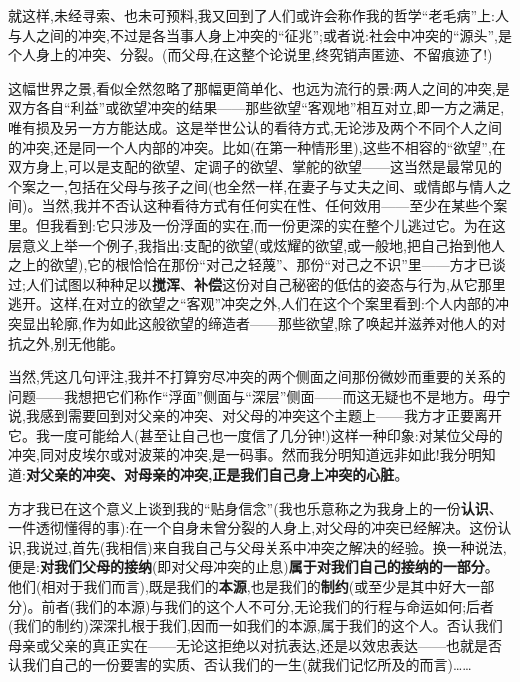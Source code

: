 就这样,未经寻索、也未可预料,我又回到了人们或许会称作我的哲学“老毛病”上:人与人之间的冲突,不过是各当事人身上冲突的“征兆”;或者说:社会中冲突的“源头”,是个人身上的冲突、分裂。(而父母,在这整个论说里,终究销声匿迹、不留痕迹了!)

这幅世界之景,看似全然忽略了那幅更简单化、也远为流行的景:两人之间的冲突,是双方各自“利益”或欲望冲突的结果——那些欲望“客观地”相互对立,即一方之满足,唯有损及另一方方能达成。这是举世公认的看待方式,无论涉及两个不同个人之间的冲突,还是同一个人内部的冲突。比如(在第一种情形里),这些不相容的“欲望”,在双方身上,可以是支配的欲望、定调子的欲望、掌舵的欲望——这当然是最常见的个案之一,包括在父母与孩子之间(也全然一样,在妻子与丈夫之间、或情郎与情人之间\dmark{})。当然,我并不否认这种看待方式有任何实在性、任何效用——至少在某些个案里。但我看到:它只涉及一份浮面的实在,而一份更深的实在整个儿逃过它。为在这层意义上举一个例子,我指出:支配的欲望(或炫耀的欲望,或一般地,把自己抬到他人之上的欲望),它的根恰恰在那份“对己之轻蔑”、那份“对己之不识”里——方才已谈过;人们试图以种种足以\textbf{搅浑}、\textbf{补偿}这份对自己秘密的低估的姿态与行为,从它那里逃开。这样,在对立的欲望之“客观”冲突之外,人们在这个个案里看到:个人内部的冲突显出轮廓,作为如此这般欲望的缔造者——那些欲望,除了唤起并滋养对他人的对抗之外,别无他能。

当然,凭这几句评注,我并不打算穷尽冲突的两个侧面之间那份微妙而重要的关系的问题——我想把它们称作“浮面”侧面与“深层”侧面——而这无疑也不是地方。毋宁说,我感到需要回到对父亲的冲突、对父母的冲突这个主题上——我方才正要离开它。我一度可能给人(甚至让自己也一度信了几分钟!)这样一种印象:对某位父母的冲突,同对皮埃尔或对波莱的冲突,是一码事。然而我分明知道远非如此!我分明知道:\textbf{对父亲的冲突、对母亲的冲突,正是我们自己身上冲突的心脏}。

方才我已在这个意义上谈到我的“贴身信念”(我也乐意称之为我身上的一份\textbf{认识}、一件透彻懂得的事):在一个自身未曾分裂的人身上,对父母的冲突已经解决。这份认识,我说过,首先(我相信)来自我自己与父母关系中冲突之解决的经验。换一种说法,便是:\textbf{对我们父母的接纳}(即对父母冲突的止息)\textbf{属于对我们自己的接纳的一部分}。他们(相对于我们而言),既是我们的\textbf{本源}\dmark{},也是我们的\textbf{制约}(或至少是其中好大一部分)。前者(我们的本源)与我们的这个人不可分,无论我们的行程与命运如何;后者(我们的制约)深深扎根于我们,因而一如我们的本源,属于我们的这个人。否认我们母亲或父亲的真正实在——无论这拒绝以对抗表达,还是以效忠表达——也就是否认我们自己的一份要害的实质、否认我们的一生(就我们记忆所及的而言)……

